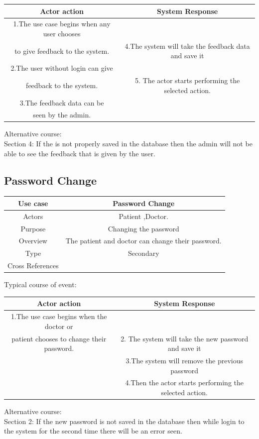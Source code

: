 \documentclass[14pt,a4paper,calibribody]{article}
\begin{document}
\begin{center}
\begin{tabular}{ |c|c| }
\hline
Actor action & System Response \\ 
\hline
1.The use case begins when any user chooses \\to give feedback to the system. & 4.The system will take the feedback data and save it  \\  
\hline
2.The user without login can give \\feedback to the system. & 5.	The actor starts performing the selected action. \\  
\hline
 3.The feedback data can be\\ seen by the admin. &  \\
\hline
\end{tabular}
\end{center}
Alternative course:\\
Section 4: If the is not properly saved in the database then the admin will not be able to see the feedback that is given by the user.


\subsection{Password Change}
\begin{center}
\begin{tabular}{ |c| c| }
\hline
Use case & Password Change  \\ 
\hline
Actors & Patient ,Doctor. \\  
\hline
Purpose & Changing the password \\ 
\hline
Overview & The patient and doctor can change their password. \\ 
\hline
Type & Secondary  \\ 
\hline
Cross References &  \\ 
\hline
\end{tabular}
\end{center}
Typical course of event:

\begin{center}
\begin{tabular}{ |c|c| }
\hline
Actor action & System Response \\ 
\hline
1.The use case begins when the doctor or\\ patient chooses to change their password. & 2. The system will take the new password and save it  \\ 
\hline
& 3.The system will remove the previous password \\ 
& 4.Then the actor starts performing the selected action. \\
\hline
\end{tabular}
\end{center}
Alternative course: \\
Section 2: If the new password is not saved in the database then while login to the system for the second time there will be an error seen.
\end{document}
